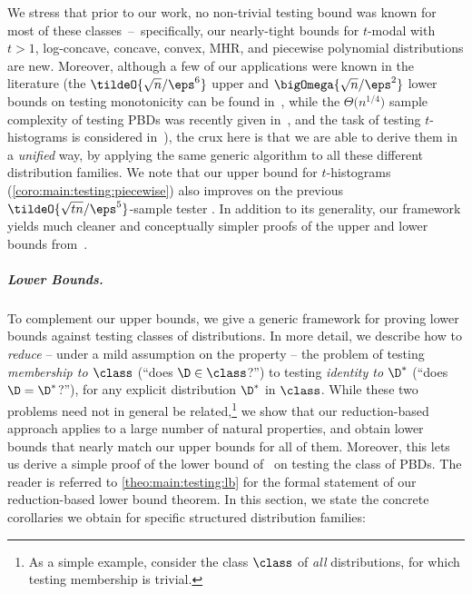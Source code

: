 We stress that prior to our work, no non-trivial testing bound was known for most of these classes~--~specifically, our nearly-tight bounds for
$t$-modal with $t>1$, log-concave, concave, convex, MHR, and piecewise polynomial distributions are new. Moreover, although a few of our applications 
were known in the literature (the $\tildeO{\sqrt{n}/\eps^6}$ upper and $\bigOmega{\sqrt{n}/\eps^2}$ lower bounds on testing monotonicity can be found in~\cite{BKR:04}, while the $\Theta\big({n^{1/4}}\big)$ sample complexity of testing PBDs was recently given\footnotemark{} in~\cite{AD:15}, and the task of testing $t$-histograms is considered in~\cite{ILR:12}), the crux here is that we are able to derive them in a \emph{unified} way, by applying the same generic algorithm to all these different distribution families. 
We note that our upper bound for $t$-histograms (\cref{coro:main:testing:piecewise}) also  improves on the previous $\tildeO{\sqrt{tn}/\eps^5}$-sample tester . In addition to its generality, our framework yields much cleaner and conceptually simpler proofs of the upper and lower bounds from~\cite{AD:15}.

\subparagraph{Lower Bounds.} To complement our upper bounds, we give a generic framework for proving lower bounds against testing classes of distributions. In more detail, we describe how to {\em reduce} -- under a mild assumption on the property \class{} -- the problem of testing \emph{membership to $\class$} (``does $\D\in\class$?'') to testing \emph{identity to $\D^\ast$} (``does $\D=\D^\ast$?''), for any explicit distribution $\D^\ast$ in $\class$. While these two problems need not in general be related,\footnote{As a simple example, consider the class $\class$ of \emph{all} distributions, for which testing membership is trivial.} we show that our reduction-based approach applies to a large number of natural properties, and obtain lower bounds that nearly match our upper bounds for all of them. 
Moreover, this lets us derive a 
simple proof of the lower bound of~\cite{AD:15} on testing the class of PBDs.
The reader is referred to \cref{theo:main:testing:lb} for the formal statement of our reduction-based lower bound theorem.
In this section, we state the concrete corollaries we obtain for specific structured distribution families:

